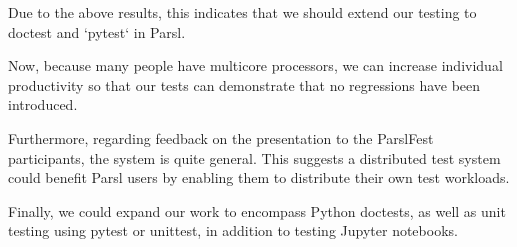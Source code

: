 Due to the above results, this indicates that we should extend our testing to doctest and `pytest` in Parsl.

Now, because many people have multicore processors, we can increase individual productivity so that our tests can demonstrate that no regressions have been introduced.

Furthermore, regarding feedback on the presentation to the ParslFest participants, the system is quite general. This suggests a distributed test system could benefit Parsl users by enabling them to distribute their own test workloads.

Finally, we could expand our work to encompass Python doctests, as well as unit testing using pytest or unittest, in addition to testing Jupyter notebooks.